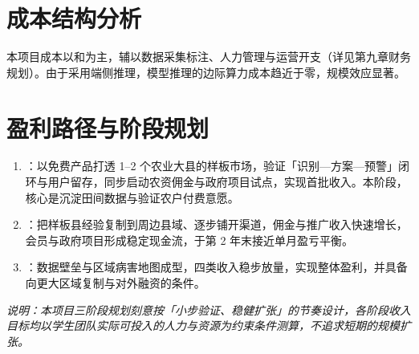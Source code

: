 \section{成本结构分析}

本项目成本以和为主，辅以数据采集标注、人力管理与运营开支（详见第九章财务规划）。由于采用端侧推理，模型推理的边际算力成本趋近于零，规模效应显著。

\section{盈利路径与阶段规划}

\begin{enumerate}[leftmargin=1.6em]
  \item {}：以免费产品打透 1--2 个农业大县的样板市场，验证「识别—方案—预警」闭环与用户留存，同步启动农资佣金与政府项目试点，实现首批收入。本阶段，核心是沉淀田间数据与验证农户付费意愿。
  \item {}：把样板县经验复制到周边县域、逐步铺开渠道，佣金与推广收入快速增长，会员与政府项目形成稳定现金流，于第 2 年末接近单月盈亏平衡。
  \item {}：数据壁垒与区域病害地图成型，四类收入稳步放量，实现整体盈利，并具备向更大区域复制与对外融资的条件。
\end{enumerate}

\noindent\textit{\small 说明：本项目三阶段规划刻意按「小步验证、稳健扩张」的节奏设计，各阶段收入目标均以学生团队实际可投入的人力与资源为约束条件测算，不追求短期的规模扩张。}
